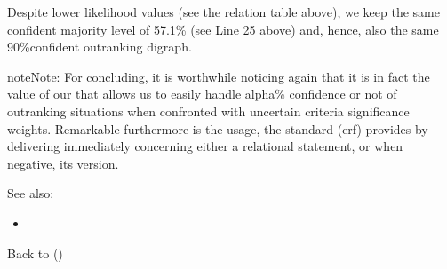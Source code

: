 \documentclass[a4paper,12pt,english]{sphinxhowto}
\begin{document}
\begin{sphinxVerbatim}[commandchars=\\\{\},numbers=left,firstnumber=1,stepnumber=1]
\end{sphinxVerbatim}
\sphinxresetverbatimhllines

\sphinxAtStartPar
Despite lower likelihood values (see the  relation table above), we keep the same confident majority level of 57.1\% (see Line 25 above) and, hence, also the same 90\%\sphinxhyphen{}confident outranking digraph.

\begin{sphinxadmonition}{note}{Note:}
\sphinxAtStartPar
For concluding, it is worthwhile noticing again that it is in fact the  value of our  that allows us to easily handle alpha\% confidence or not of outranking situations when confronted with uncertain criteria significance weights. Remarkable furthermore is the usage, the standard  (erf) provides by delivering  immediately concerning either a  relational statement, or when negative, its  version.
\end{sphinxadmonition}


\begin{sphinxseealso}{See also:}
\begin{itemize}
\item {} 
\sphinxAtStartPar
{}

\end{itemize}


\end{sphinxseealso}


\sphinxAtStartPar
Back to {\hyperref[\detokenize{pearls:pearls-label}]{}} ()
\end{document}
